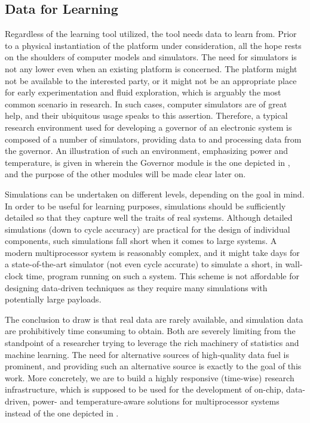\subsection{Data for Learning} 

Regardless of the learning tool utilized, the tool needs data to learn from.
Prior to a physical instantiation of the platform under consideration, all the
hope rests on the shoulders of computer models and simulators. The need for
simulators is not any lower even when an existing platform is concerned. The
platform might not be available to the interested party, or it might not be an
appropriate place for early experimentation and fluid exploration, which is
arguably the most common scenario in research. In such cases, computer
simulators are of great help, and their ubiquitous usage speaks to this
assertion. Therefore, a typical research environment used for developing a
governor of an electronic system is composed of a number of simulators,
providing data to and processing data from the governor. An illustration of such
an environment, emphasizing power and temperature, is given in
 wherein the Governor module is the one depicted in
, and the purpose of the other modules will be made clear later
on.

Simulations can be undertaken on different levels, depending on the goal in
mind. In order to be useful for learning purposes, simulations should be
sufficiently detailed so that they capture well the traits of real systems.
Although detailed simulations (down to cycle accuracy) are practical for the
design of individual components, such simulations fall short when it comes to
large systems. A modern multiprocessor system is reasonably complex, and it
might take days for a state-of-the-art simulator (not even cycle accurate) to
simulate a short, in wall-clock time, program running on such a system. This
scheme is not affordable for designing data-driven techniques as they require
many simulations with potentially large payloads.

The conclusion to draw is that real data are rarely available, and simulation
data are prohibitively time consuming to obtain. Both are severely limiting from
the standpoint of a researcher trying to leverage the rich machinery of
statistics and machine learning. The need for alternative sources of
high-quality data fuel is prominent, and providing such an alternative source is
exactly to the goal of this work. More concretely, we are to build a highly
responsive (time-wise) research infrastructure, which is supposed to be used for
the development of on-chip, data-driven, power- and temperature-aware solutions
for multiprocessor systems instead of the one depicted in .
